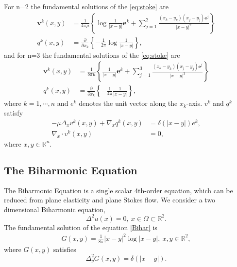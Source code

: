 \documentclass[hyperref]{article}
\numberwithin{equation}{section}
\theoremstyle{nonumberplain}
\begin{document}
	For n=2 the fundamental solutions of the \eqref{eq:stoke} are
	\begin{equation}\begin{aligned}
			\boldsymbol{v}^{k}(x, y) &=\frac{1}{4 \pi \mu}\left\{\log \frac{1}{|x-y|} \boldsymbol{e}^{k}+\sum_{j=1}^{2} \frac{\left(x_{k}-y_{k}\right)\left(x_{j}-y_{j}\right) \boldsymbol{e}^{j}}{|x-y|^{2}}\right\} \\
			q^{k}(x, y) &=\frac{\partial}{\partial x_{k}}\left\{-\frac{1}{2 \pi} \log \frac{1}{|x-y|}\right\},
	\end{aligned}\end{equation}
	and for n=3 the fundamental solutions of the \eqref{eq:stoke} are
	\begin{equation}\begin{aligned}
			\boldsymbol{v}^{k}(x, y) &=\frac{1}{8 \pi \mu}\left\{\frac{1}{|x-y|} \boldsymbol{e}^{k}+\sum_{j=1}^{3} \frac{\left(x_{k}-y_{k}\right)\left(x_{j}-y_{j}\right) \boldsymbol{e}^{j}}{|x-y|^{3}}\right\} \\
			q^{k}(x, y) &=\frac{\partial}{\partial x_{k}}\left\{-\frac{1}{4 \pi} \frac{1}{|x-y|}\right\},
	\end{aligned}\end{equation}
	where $k=1,\cdots,n$ and $e^k$ denotes the unit vector along the $x_k$-axis. $v^k$ and $q^k$ satisfy 
	\begin{equation}
		\begin{aligned}
			-\mu\Delta_x v^k(x,y)+\nabla_x q^k(x,y)&=\delta(|x-y|)e^k,\\
			\nabla_x\cdot v^k(x,y)&=0,
		\end{aligned}
		\label{eq:stoke}
	\end{equation}
	where $x,y\in\mathbb{R}^n$.
	
	\subsection{The Biharmonic Equation}
	The Biharmonic Equation is a single scalar 4th-order equation, which can be reduced from plane elasticity and plane Stokes flow. We consider a two dimensional Biharmonic equation,
	\begin{equation}
		\Delta^2u(x)=0, \ x\in\Omega\subset\mathbb{R}^2.
		\label{Bihar}
	\end{equation}
	The fundamental solution of the equation \eqref{Bihar} is 
	\begin{equation}
		\begin{aligned}
			G(x,y) = \frac{1}{8\pi}|x-y|^2\log|x-y|, \ x,y\in\mathbb{R}^2,
		\end{aligned}
	\end{equation}
	where $G(x,y)$ satisfies 
	$$\Delta_y^2 G(x,y)=\delta(|x-y|).$$
	
\end{document}
